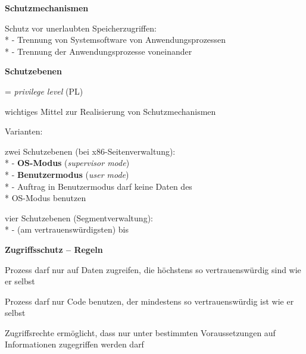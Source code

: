 \textbf{Schutzmechanismen}
\begin{items}
  \item Schutz vor unerlaubten Speicherzugriffen: \\*
    - Trennung von Systemsoftware von Anwendungsprozessen \\*
    - Trennung der Anwendungsprozesse voneinander
\end{items}

\textbf{Schutzebenen}
\begin{items}
  \item = \emph{privilege level} (PL)
  \item wichtiges Mittel zur Realisierung von Schutzmechanismen
  \item Varianten:
  \begin{enumeration}
    \item zwei Schutzebenen (bei x86-Seitenverwaltung): \\*
      - \textbf{OS-Modus} (\emph{supervisor mode}) \\*
      - \textbf{Benutzermodus} (\emph{user mode}) \\*
      - Auftrag in Benutzermodus darf keine Daten des \\* \phantom{-} OS-Modus benutzen
    \item vier Schutzebenen (Segmentverwaltung): \\*
      -  (am vertrauenswürdigsten) bis 
  \end{enumeration}
\end{items}

\textbf{Zugriffsschutz -- Regeln}
\begin{items}
  \item Prozess darf nur auf Daten zugreifen, die höchstens so vertrauenswürdig sind wie er selbst
  \item Prozess darf nur Code benutzen, der mindestens so vertrauenswürdig ist wie er selbst
  \item Zugriffsrechte ermöglicht, dass nur unter bestimmten Voraussetzungen auf Informationen zugegriffen werden darf
\end{items}